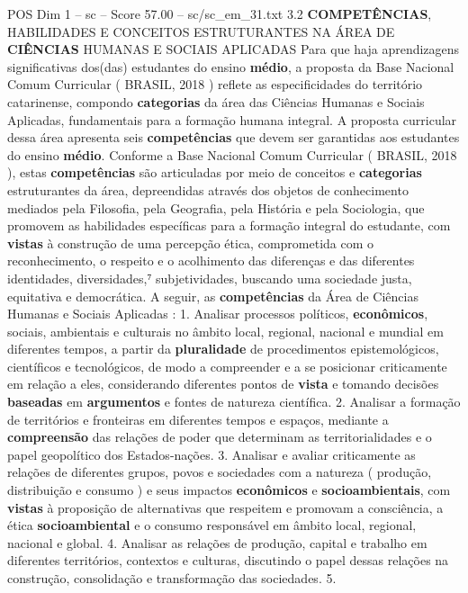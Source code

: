 \begin{textsample}{POS Dim 1 – sc – Score 57.00 – sc/sc\_em\_31.txt}  \label{ex:f1_pos_019}
3.2 \textbf{COMPETÊNCIAS}, HABILIDADES E CONCEITOS ESTRUTURANTES NA ÁREA DE \textbf{CIÊNCIAS} HUMANAS E SOCIAIS APLICADAS Para que haja aprendizagens significativas dos(das) estudantes do ensino \textbf{médio}, a proposta da Base Nacional Comum Curricular ( BRASIL, 2018 ) reflete as especificidades do território catarinense, compondo \textbf{categorias} da área das Ciências Humanas e Sociais Aplicadas, fundamentais para a formação humana integral.
A proposta curricular dessa área apresenta seis \textbf{competências} que devem ser garantidas aos estudantes do ensino \textbf{médio}.
Conforme a Base Nacional Comum Curricular ( BRASIL, 2018 ), estas \textbf{competências} são articuladas por meio de conceitos e \textbf{categorias} estruturantes da área, depreendidas através dos objetos de conhecimento mediados pela Filosofia, pela Geografia, pela História e pela Sociologia, que promovem as habilidades específicas para a formação integral do estudante, com \textbf{vistas} à construção de uma percepção ética, comprometida com o reconhecimento, o respeito e o acolhimento das diferenças e das diferentes identidades, diversidades,⁷ subjetividades, buscando uma sociedade justa, equitativa e democrática.
A seguir, as \textbf{competências} da Área de Ciências Humanas e Sociais Aplicadas : 1.
Analisar processos políticos, \textbf{econômicos}, sociais, ambientais e culturais no âmbito local, regional, nacional e mundial em diferentes tempos, a partir da \textbf{pluralidade} de procedimentos epistemológicos, científicos e tecnológicos, de modo a compreender e a se posicionar criticamente em relação a eles, considerando diferentes pontos de \textbf{vista} e tomando decisões \textbf{baseadas} em \textbf{argumentos} e fontes de natureza científica. 2.
Analisar a formação de territórios e fronteiras em diferentes tempos e espaços, mediante a \textbf{compreensão} das relações de poder que determinam as territorialidades e o papel geopolítico dos Estados-nações. 3.
Analisar e avaliar criticamente as relações de diferentes grupos, povos e sociedades com a natureza ( produção, distribuição e consumo ) e seus impactos \textbf{econômicos} e \textbf{socioambientais}, com \textbf{vistas} à proposição de alternativas que respeitem e promovam a consciência, a ética \textbf{socioambiental} e o consumo responsável em âmbito local, regional, nacional e global. 4.
Analisar as relações de produção, capital e trabalho em diferentes territórios, contextos e culturas, discutindo o papel dessas relações na construção, consolidação e transformação das sociedades. 5.

\end{textsample}
